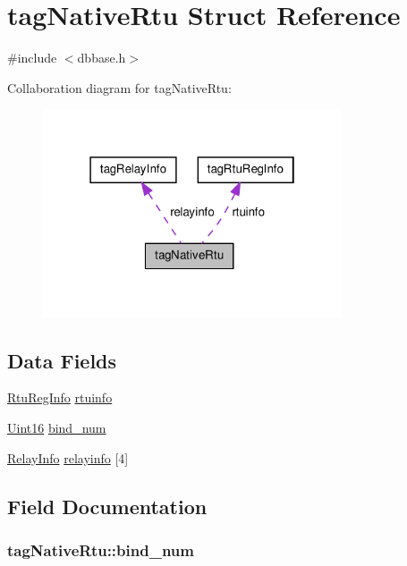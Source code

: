 \hypertarget{structtagNativeRtu}{\section{tag\-Native\-Rtu Struct Reference}
\label{structtagNativeRtu}
}


{\ttfamily \#include $<$dbbase.\-h$>$}



Collaboration diagram for tag\-Native\-Rtu\-:\nopagebreak
\begin{figure}[H]
\begin{center}
\leavevmode
\includegraphics[width=250pt]{structtagNativeRtu__coll__graph}
\end{center}
\end{figure}
\subsection*{Data Fields}
\begin{DoxyCompactItemize}
\item 
\hyperlink{dbbase_8h_a4f06859d090e81c1be0c142757ce6e11}{Rtu\-Reg\-Info} \hyperlink{structtagNativeRtu_afc100edeb735a0a051804fca82eda4e6}{rtuinfo}
\item 
\hyperlink{base_8h_ae9f2e1f80fbd243687a04febbf590e13}{Uint16} \hyperlink{structtagNativeRtu_a672be5bf70da9212f5bd981fe94d0dc0}{bind\-\_\-num}
\item 
\hyperlink{dbbase_8h_a0b03d4572aa748e31ba159ba4f9a647d}{Relay\-Info} \hyperlink{structtagNativeRtu_a1a9ac94c9e3ccb6676c4cc60ab67b287}{relayinfo} \mbox{[}4\mbox{]}
\end{DoxyCompactItemize}


\subsection{Field Documentation}
\hypertarget{structtagNativeRtu_a672be5bf70da9212f5bd981fe94d0dc0}{
\subsubsection[{bind\-\_\-num}]{ tag\-Native\-Rtu\-::bind\-\_\-num}}\label{structtagNativeRtu_a672be5bf70da9212f5bd981fe94d0dc0}


